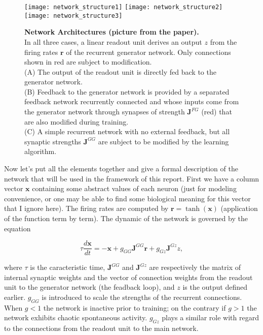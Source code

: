 \begin{figure}[H]
  \centering
  \texttt{[image: network\_structure1]}
  \hfill
  \texttt{[image: network\_structure2]}
  \hfill
  \texttt{[image: network\_structure3]}
  \vspace{0.8em}
  \caption{
    \textbf{Network Architectures (picture from the paper).}\\[0.1em]
    In all three cases, a linear readout unit derives an output $z$
    from the firing rates $\mathbf{r}$ of the recurrent generator network.
    Only connections shown in red are subject to modification.\\[0.1em]
    (A) The output of the readout unit is directly fed back to the
    generator network.\\[0.1em]
    (B) Feedback to the generator network is provided by a separated
    feedback network recurrently connected and whose inputs come from
    the generator network through synapses of strength $\mathbf{J}^{FG}$
    (red) that are also modified during training.\\[0.1em]
    (C) A simple recurrent network with no external feedback, but all
    synaptic strengths $\mathbf{J}^{GG}$ are subject to be modified by 
    the learning algorithm.
  }
  \label{fig: network_structures}
\end{figure}

Now let's put all the elements together and give a formal description of
the network that will be used in the framework of this report. First
we have a column vector $\mathbf{x}$ containing some abstract values of
each neuron (just for modeling convenience, or one may be able to find
some biological meaning for this vector that I ignore here). The firing
rates are computed by $\mathbf{r} = \tanh(\mathbf{x})$ (application of
the function term by term). The dynamic of the network is governed by
the equation

\[
  \tau \frac{d\mathbf{x}}{dt} = 
  -\mathbf{x} + g_{GG}\mathbf{J}^{GG}\mathbf{r}
  + g_{Gz} \mathbf{J}^{Gz} z,
\]

where $\tau$ is the caracteristic time, $\mathbf{J}^{GG}$ and 
$\mathbf{J}^{Gz}$ are respectively the matrix of internal synaptic 
weights and the vector of connection weights from the readout unit 
to the generator network (the feadback loop), and $z$ is the output
defined earlier. $g_{GG}$ is introduced to scale the strengths of 
the recurrent connections. When $g<1$ the network is inactive prior to
training; on the contrary if $g>1$ the network exhibits chaotic spontaneous
activity. $g_{Gz}$ plays a similar role with regard to the connections
from the readout unit to the main network.

